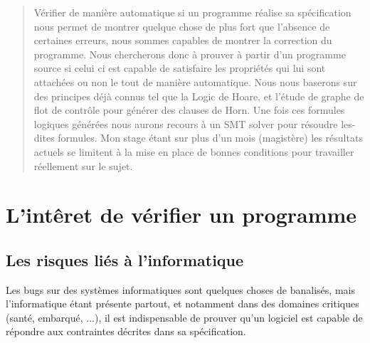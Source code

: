 \begin{abstract}


	Vérifier de manière automatique si un programme réalise sa spécification nous permet de montrer quelque chose de plus fort que l'absence de certaines erreurs, nous sommes capables de montrer la correction du programme. 
	Nous chercherons donc à prouver à partir d'un programme source si celui ci est capable de satisfaire les propriétés qui lui sont attachées ou non le tout de manière automatique.
		Nous nous baserons sur des principes déjà connus tel que la Logic de Hoare, et l'étude de graphe de flot de contrôle pour générer des clauses de Horn.
	Une fois ces formules logiques générées nous aurons recours à un SMT solver pour résoudre les-dites formules.
	Mon stage étant sur plus d'un mois (magistère) les résultats actuels se limitent à la mise en place de bonnes conditions pour travailler réellement sur le sujet.



\end{abstract}

\section{L'intêret de vérifier un programme}
\label{sec:1}
\subsection{Les risques liés à l'informatique}
	Les bugs sur des systèmes informatiques sont quelques choses de banalisés, mais l'informatique étant présente partout, et notamment dans des domaines critiques (santé, embarqué, ...), il est indispensable de prouver qu'un logiciel est capable de répondre aux contraintes décrites dans sa spécification.

